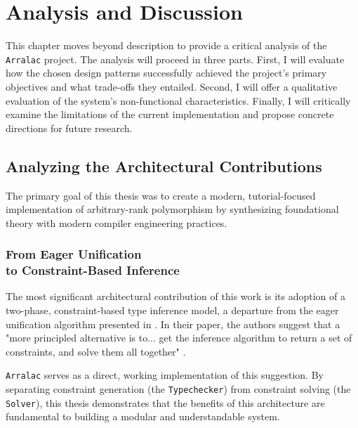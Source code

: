 \chapter{Analysis and Discussion}
\label{chap:AnalysisAndDiscussion}

This chapter moves beyond description to provide a critical analysis of the \texttt{Arralac} project. The analysis will proceed in three parts. First, I will evaluate how the chosen design patterns successfully achieved the project's primary objectives and what trade-offs they entailed. Second, I will offer a qualitative evaluation of the system's non-functional characteristics. Finally, I will critically examine the limitations of the current implementation and propose concrete directions for future research.

\section{Analyzing the Architectural Contributions}
\label{sec:Discussion:Objectives}

The primary goal of this thesis was to create a modern, tutorial-focused implementation of arbitrary-rank polymorphism by synthesizing foundational theory with modern compiler engineering practices.

\subsection[From Eager Unification to Constraint-Based Inference]{From Eager Unification \\ to Constraint-Based Inference}
The most significant architectural contribution of this work is its adoption of a two-phase, constraint-based type inference model, a departure from the eager unification algorithm presented in \cite{jones-practical-2007}. In their paper, the authors suggest that a "more principled alternative is to... get the inference algorithm to return a set of constraints, and solve them all together" \cite[Sec. 9.6]{jones-practical-2007}.

\texttt{Arralac} serves as a direct, working implementation of this suggestion. By separating constraint generation (the \texttt{Typechecker}) from constraint solving (the \texttt{Solver}), this thesis demonstrates that the benefits of this architecture are fundamental to building a modular and understandable system.

